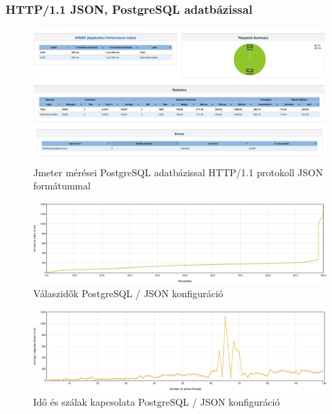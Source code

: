 \subsubsection{HTTP/1.1 JSON, PostgreSQL adatbázissal}
\begin{figure}[hbt!]
    \centering
    \includegraphics[scale=0.2]{images/jmeter-json-postgres}
    \caption{Jmeter mérései PostgreSQL adatbázissal HTTP/1.1 protokoll JSON formátummal}
    \label{fig:jmeter-json-postgres}
\end{figure}

\begin{figure}[hbt!]
    \centering
    \includegraphics[scale=0.3]{images/json-postgres-response-times}
    \caption{Válaszidők PostgreSQL / JSON konfiguráció}
    \label{fig:json-postgres-response-times}
\end{figure}

\begin{figure}[hbt!]
    \centering
    \includegraphics[scale=0.3]{images/json-time-vs-threads}
    \caption{Idő és szálak kapcsolata PostgreSQL / JSON konfiguráció}
    \label{fig:json-time-vs-threads}
\end{figure}

